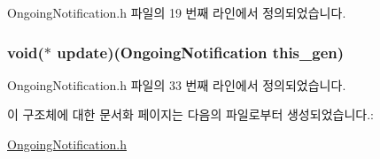 Ongoing\-Notification.\-h 파일의 19 번째 라인에서 정의되었습니다.

\hypertarget{struct___ongoing_notification_ae5eaf248602ec0edb1334d47d959f0e9}{
\subsubsection[{update}]{\setlength{\rightskip}{0pt plus 5cm}void($\ast$  update)({\bf Ongoing\-Notification} this\-\_\-gen)}}\label{struct___ongoing_notification_ae5eaf248602ec0edb1334d47d959f0e9}


Ongoing\-Notification.\-h 파일의 33 번째 라인에서 정의되었습니다.



이 구조체에 대한 문서화 페이지는 다음의 파일로부터 생성되었습니다.\-:\begin{DoxyCompactItemize}
\item 
\hyperlink{_ongoing_notification_8h}{Ongoing\-Notification.\-h}\end{DoxyCompactItemize}
